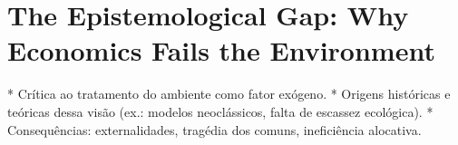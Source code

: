
\section{The Epistemological Gap: Why Economics Fails the Environment}

* Crítica ao tratamento do ambiente como fator exógeno. * Origens históricas e teóricas dessa visão (ex.: modelos neoclássicos, falta de escassez ecológica). * Consequências: externalidades, tragédia dos comuns, ineficiência alocativa.


